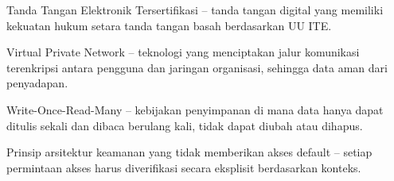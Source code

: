 \documentclass[12pt,a4paper]{report}
\begin{document}
{\begin{description}[leftmargin=2.5cm, style=nextline]
    \item[TTE] Tanda Tangan Elektronik Tersertifikasi -- tanda tangan digital yang memiliki kekuatan hukum setara tanda tangan basah berdasarkan UU ITE.
    \item[VPN] Virtual Private Network -- teknologi yang menciptakan jalur komunikasi terenkripsi antara pengguna dan jaringan organisasi, sehingga data aman dari penyadapan.
    \item[WORM] Write-Once-Read-Many -- kebijakan penyimpanan di mana data hanya dapat ditulis sekali dan dibaca berulang kali, tidak dapat diubah atau dihapus.
    \item[\textit{Zero Trust}] Prinsip arsitektur keamanan yang tidak memberikan akses default -- setiap permintaan akses harus diverifikasi secara eksplisit berdasarkan konteks.
\end{description}
}
\newpage
\end{document}
